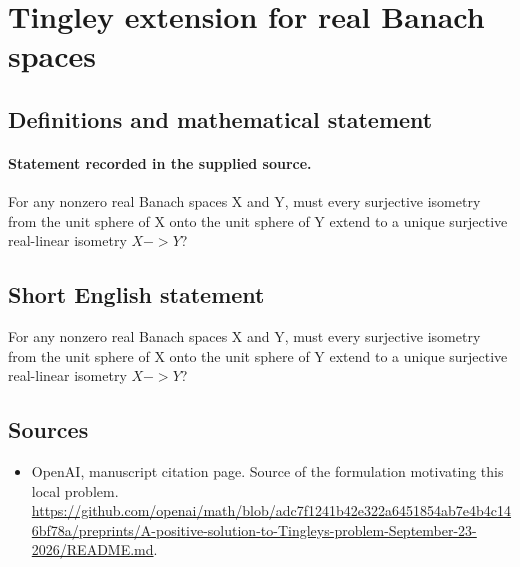 \documentclass[11pt]{article}
\begin{document}
\section*{Tingley extension for real Banach spaces}\label{statement}
\subsection{Definitions and mathematical statement}
\paragraph{Statement recorded in the supplied source.}
For any nonzero real Banach spaces X and Y, must every surjective isometry from the unit sphere of X onto the unit sphere of Y extend to a unique surjective real-linear isometry $X->Y$?
\subsection{Short English statement}
For any nonzero real Banach spaces X and Y, must every surjective isometry from the unit sphere of X onto the unit sphere of Y extend to a unique surjective real-linear isometry $X->Y$?
\subsection{Sources}
\begin{itemize}
\item[S1] OpenAI, manuscript citation page. Source of the formulation motivating this local problem.
\url{https://github.com/openai/math/blob/adc7f1241b42e322a6451854ab7e4b4c146bf78a/preprints/A-positive-solution-to-Tingleys-problem-September-23-2026/README.md}.
\end{itemize}
\end{document}
